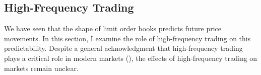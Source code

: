 



\subsection{High-Frequency Trading}
\label{sec:hft}

We have seen that the shape of limit order books predicts future price movements. In this section, I examine the role of high-frequency trading on this predictability. Despite a general acknowledgment that high-frequency trading plays a critical role in modern markets (\citet{OHara2015}), the effects of high-frequency trading on markets remain unclear.

